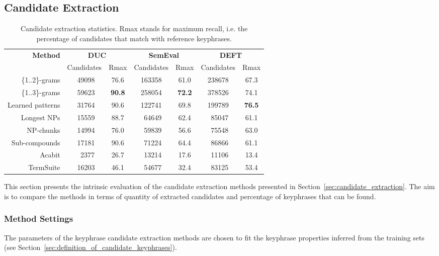   \subsection{Candidate Extraction}
  \label{subsec:candidate_extraction}
    \begin{table*}
      \centering
      \begin{tabular}{rcccccc}
        \toprule
        \multirow{2}{*}[-2pt]{\textbf{Method}} & \multicolumn{2}{c}{\textbf{DUC}} & \multicolumn{2}{c}{\textbf{SemEval}} & \multicolumn{2}{c}{\textbf{DEFT}}\\
        \cmidrule(r){2-3}\cmidrule(lr){4-5}\cmidrule(l){6-7}
        & Candidates & Rmax & Candidates & Rmax & Candidates & Rmax\\
        \midrule
        \{1..2\}-grams & $~~$49098 & 76.6 & 163358 & 61.0 & 238678 & 67.3\\
        \{1..3\}-grams & $~~$59623 & \textbf{90.8} & 258054 & \textbf{72.2} & 378526 & 74.1\\
        Learned patterns & $~~$31764 & 90.6 & 122741 & 69.8 & 199789 & \textbf{76.5}\\
        Longest NPs & $~~$15559 & 88.7 & $~~$64649 & 62.4 & $~~$85047 & 61.1\\
        NP-chunks & $~~$14994 & 76.0 & $~~$59839 & 56.6 & $~~$75548 & 63.0\\
        Sub-compounds & $~~$17181 & 90.6 & $~~$71224 & 64.4 & $~~$86866 & 61.1\\
        Acabit & $~~~~$2377 & 26.7 & $~~$13214 & 17.6 & $~~$11106 & 13.4\\
        TermSuite & $~~$16203 & 46.1 & $~~$54677 & 32.4 & $~~$83125 & 53.4\\
        \bottomrule
      \end{tabular}
      \caption{Candidate extraction statistics. Rmax stands for maximum recall,
               i.e. the percentage of candidates that match with reference
               keyphrases. \label{tab:candidate_extraction_statistics}}
    \end{table*}

    This section presents the intrinsic evaluation of the candidate extraction
    methods presented in Section~\ref{sec:candidate_extraction}. The aim is to
    compare the methods in terms of quantity of extracted candidates and
    percentage of keyphrases that can be found.

    \subsubsection{Method Settings}
    \label{subsubsec:method_settings}
      The parameters of the keyphrase candidate extraction methods are chosen to
      fit the keyphrase properties inferred from the training sets (see
      Section~\ref{sec:definition_of_candidate_keyphrases}).

